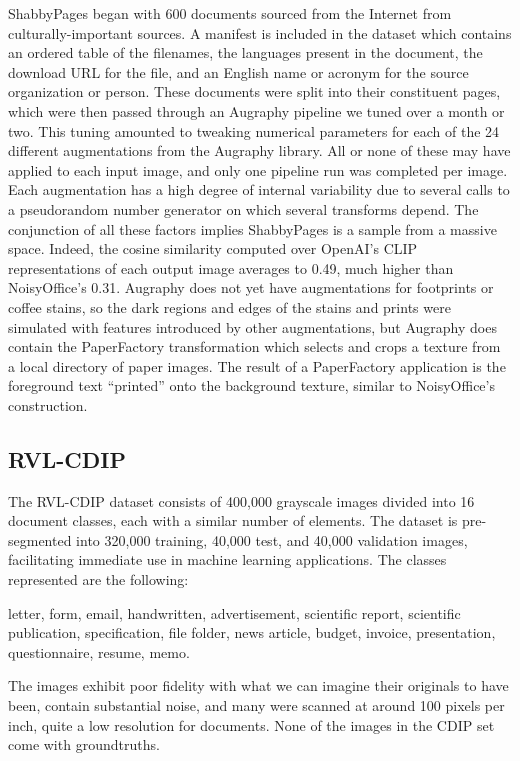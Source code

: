 \documentclass[runningheads]{llncs}
\begin{document}
ShabbyPages began with 600 documents sourced from the Internet from culturally-important sources. A manifest is included in the dataset which contains an ordered table of the filenames, the languages present in the document, the download URL for the file, and an English name or acronym for the source organization or person. These documents were split into their constituent pages, which were then passed through an Augraphy pipeline we tuned over a month or two. This tuning amounted to tweaking numerical parameters for each of the 24 different augmentations from the Augraphy library. All or none of these may have applied to each input image, and only one pipeline run was completed per image. Each augmentation has a high degree of internal variability due to several calls to a pseudorandom number generator on which several transforms depend. The conjunction of all these factors implies ShabbyPages is a sample from a massive space. Indeed, the cosine similarity computed over OpenAI's CLIP representations of each output image averages to 0.49, much higher than NoisyOffice's 0.31. Augraphy does not yet have augmentations for footprints or coffee stains, so the dark regions and edges of the stains and prints were simulated with features introduced by other augmentations, but Augraphy does contain the PaperFactory transformation which selects and crops a texture from a local directory of paper images. The result of a PaperFactory application is the foreground text ``printed'' onto the background texture, similar to NoisyOffice's construction.

\subsection{RVL-CDIP}
The RVL-CDIP dataset \cite{ref_RVL-CDIP} consists of 400,000 grayscale images divided into 16 document classes, each with a similar number of elements. The dataset is pre-segmented into 320,000 training, 40,000 test, and 40,000 validation images, facilitating immediate use in machine learning applications. The classes represented are the following:

\begin{center}
letter, form, email, handwritten, advertisement, scientific report,
scientific publication, specification, file folder, news article,
budget, invoice, presentation, questionnaire, resume, memo.
\end{center}

The images exhibit poor fidelity with what we can imagine their originals to have been, contain substantial noise, and many were scanned at around 100 pixels per inch, quite a low resolution for documents. None of the images in the CDIP set come with groundtruths.\\
\end{document}
